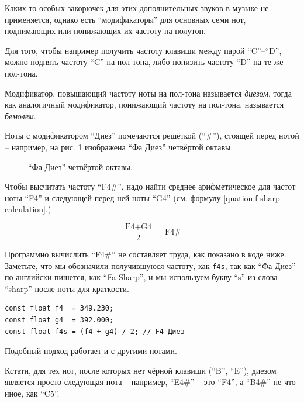 \documentclass[a4paper,twoside]{book}
\begin{document}
Каких-то особых закорючек для этих дополнительных звуков в музыке не
применяется, однако есть ``модификаторы'' для основных семи нот, поднимающих или
понижающих их частоту на полутон.

Для того, чтобы например получить частоту клавиши между парой ``C''--``D'',
можно поднять частоту ``C'' на пол-тона, либо понизить частоту ``D'' на те же
пол-тона.

Модификатор, повышающий частоту ноты на пол-тона называется \emph{диезом}, тогда
как аналогичный модификатор, понижающий частоту на пол-тона, называется
\emph{бемолем}.

Ноты с модификатором ``Диез'' помечаются решёткой (``\#''), стоящей перед нотой
-- например, на рис. \ref{fig:lilypond-f4-sharp} изображена ``Фа Диез''
четвёртой октавы.

\begin{figure}[ht]
  \caption{``Фа Диез'' четвёртой октавы.}
  \centering
  \label{fig:lilypond-f4-sharp}
\end{figure}

Чтобы высчитать частоту ``F4\#'', надо найти среднее арифметическое для частот
ноты ``F4'' и следующей перед ней ноты ``G4'' (см. формулу
\ref{quation:f-sharp-calculation}.)

\begin{equation}
  \frac{\mbox{F4} + \mbox{G4}}{2} = \mbox{F4\#}
  \label{quation:f-sharp-calculation}
\end{equation}

Программно вычислить ``F4\#'' не составляет труда, как показано в коде ниже.
Заметьте, что мы обозначили получившуюся частоту, как \texttt{f4s}, так как ``Фа
Диез'' по-английски пишется, как ``Fa Sharp'', и мы используем букву ``s'' из
слова ``sharp'' после ноты для краткости.

\begin{verbatim}
const float f4  = 349.230;
const float g4  = 392.000;
const float f4s = (f4 + g4) / 2; // F4 Диез
\end{verbatim}

Подобный подход работает и с другими нотами.

Кстати, для тех нот, после которых нет чёрной клавиши (``B'', ``E''), диезом
является просто следующая нота -- например, ``E4\#'' -- это ``F4'', а ``B4\#'' не
что иное, как ``C5''.
\end{document}
